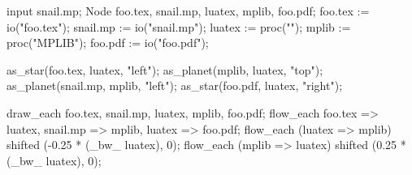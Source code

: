\usemodule[zhfonts]
\startMPpage
input snail.mp;
Node foo.tex, snail.mp, luatex, mplib, foo.pdf;
foo.tex := io("foo.tex");
snail.mp := io("snail.mp");
luatex := proc("\LUATEX");
mplib := proc("MPLIB");
foo.pdf := io("foo.pdf");

as_star(foo.tex, luatex, "left");
as_planet(mplib, luatex, "top");
as_planet(snail.mp, mplib, "left");
as_star(foo.pdf, luatex, "right");

draw_each foo.tex, snail.mp, luatex, mplib, foo.pdf;
flow_each foo.tex => luatex, snail.mp => mplib, luatex => foo.pdf;
flow_each (luatex => mplib) shifted (-0.25 * (_bw_ luatex), 0);
flow_each (mplib => luatex) shifted (0.25 * (_bw_ luatex), 0);
\stopMPpage
